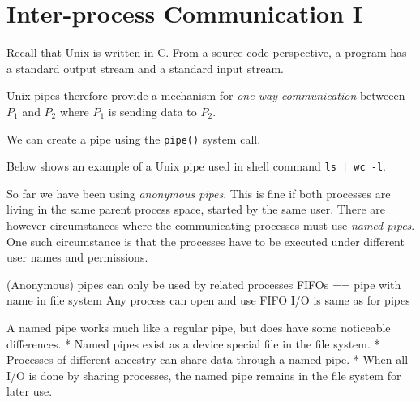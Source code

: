 \section{Inter-process Communication I}



Recall that Unix is written in C. From a source-code perspective, 
a program has a standard output stream and a standard input stream. 


Unix pipes therefore provide a mechanism
for \textit{one-way communication} betweeen $P_1$ and $P_2$ where 
$P_1$ is sending data to $P_2$. 

We can create a pipe using the \lstinline{pipe()} system call.




\begin{example}
Below shows an example of a Unix pipe used in shell command \lstinline{ls | wc -l}.

\begin{figure}[h]
\end{figure} 
\end{example}

So far we have been using \textit{anonymous pipes}. This is fine if both 
processes are living in the same parent process space, 
started by the same user. 
There are however circumstances where the communicating processes
must use \textit{named pipes}. One such circumstance is that the processes have to be executed under different user names and permissions.


(Anonymous) pipes can only be used by related 
processes
FIFOs == pipe with name in file system
Any process can open and use FIFO
I/O is same as for pipes

A named pipe works much like a regular pipe, but does have
some noticeable differences.
* Named pipes exist as a device special file in the file
system.
* Processes of different ancestry can share data through a
named pipe.
* When all I/O is done by sharing processes, the named 
pipe remains in the file system for later use.


